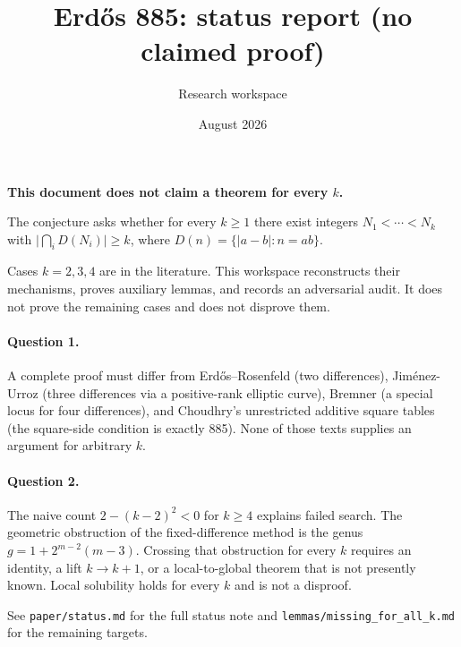 \documentclass{article}
\title{Erdős 885: status report (no claimed proof)}
\author{Research workspace}
\date{August 2026}
\begin{document}
\maketitle

\noindent\textbf{This document does not claim a theorem for every \(k\).}

The conjecture asks whether for every \(k\ge 1\) there exist integers
\(N_1<\cdots<N_k\) with \(\lvert\bigcap_i D(N_i)\rvert\ge k\), where
\(D(n)=\{\lvert a-b\rvert:n=ab\}\).

Cases \(k=2,3,4\) are in the literature. This workspace reconstructs
their mechanisms, proves auxiliary lemmas, and records an adversarial
audit. It does not prove the remaining cases and does not disprove them.

\paragraph{Question 1.}
A complete proof must differ from Erdős--Rosenfeld (two differences),
Jiménez-Urroz (three differences via a positive-rank elliptic curve),
Bremner (a special locus for four differences), and Choudhry's
unrestricted additive square tables (the square-side condition is
exactly 885). None of those texts supplies an argument for arbitrary
\(k\).

\paragraph{Question 2.}
The naive count \(2-(k-2)^2<0\) for \(k\ge 4\) explains failed search.
The geometric obstruction of the fixed-difference method is the genus
\(g=1+2^{m-2}(m-3)\). Crossing that obstruction for every \(k\) requires
an identity, a lift \(k\to k+1\), or a local-to-global theorem that is
not presently known. Local solubility holds for every \(k\) and is not
a disproof.

See \texttt{paper/status.md} for the full status note and
\texttt{lemmas/missing\_for\_all\_k.md} for the remaining targets.
\end{document}
